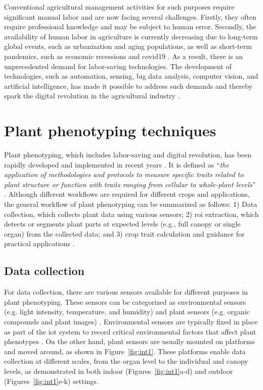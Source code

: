 Conventional agricultural management activities for such purposes require significant manual labor and are now facing several challenges. Firstly, they often require professional knowledge and may be subject to human error. Secondly, the availability of human labor in agriculture is currently decreasing due to long-term global events, such as urbanization and aging populations, as well as short-term pandemics, such as economic recessions and \gls{covid19} \citep{gallardo_adoption_2018, larue_labor_2020}. As a result, there is an unprecedented demand for labor-saving technologies. The development of technologies, such as automation, sensing, big data analysis, computer vision, and artificial intelligence, has made it possible to address such demands and thereby spark the digital revolution in the agricultural industry \citep{gallardo_adoption_2018}.

\section{Plant phenotyping techniques}
Plant phenotyping, which includes labor-saving and digital revolution, has been rapidly developed and implemented in recent years \citep{araus_field_2014}. It is defined as ``\textit{the application of methodologies and protocols to measure specific traits related to plant structure or function with traits ranging from cellular to whole-plant levels}'' \citep{fiorani_future_2013, ghanem_physiological_2015}. Although different workflows are required for different crops and applications, the general workflow of plant phenotyping can be summarized as follows: 1) Data collection, which collects plant data using various sensors; 2) \gls{roi} extraction, which detects or segments plant parts at expected levels (e.g., full canopy or single organ) from the collected data; and 3) crop trait calculation and guidance for practical applications \citep{zhao_crop_2019}.

\subsection{Data collection}
For data collection, there are various sensors available for different purposes in plant phenotyping. These sensors can be categorized as environmental sensors (e.g. light intensity, temperature, and humidity) and plant sensors (e.g. organic compounds and plant images) \citep{garlando_plants_2020}. Environmental sensors are typically fixed in place as part of the \gls{iot} system to record critical environmental factors that affect plant phenotypes \citep{ghanem_physiological_2015}. On the other hand, plant sensors are usually mounted on platforms and moved around, as shown in Figure~\ref{fig:int1}. These platforms enable data collection at different scales, from the organ level to the individual and canopy levels, as demonstrated in both indoor (Figures~\ref{fig:int1}a-d) and outdoor (Figures~\ref{fig:int1}e-k) settings.

